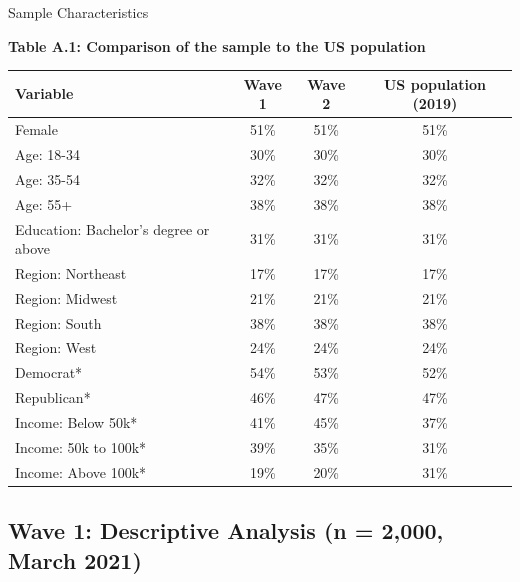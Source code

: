 \documentclass{beamer}
\begin{document}
\begin{frame}{Sample Characteristics}

\begin{table}[h]
    \centering
    \scriptsize
    \textbf{Table A.1: Comparison of the sample to the US population}\par
    \begin{tabular}{lccc}
    \toprule\toprule
    Variable & Wave 1 & Wave 2 & US population (2019) \\
    \midrule
    Female                              & 51\% & 51\% & 51\% \\
    Age: 18-34                          & 30\% & 30\% & 30\% \\
    Age: 35-54                          & 32\% & 32\% & 32\% \\
    Age: 55+                            & 38\% & 38\% & 38\% \\
    Education: Bachelor's degree or above & 31\% & 31\% & 31\% \\
    Region: Northeast                   & 17\% & 17\% & 17\% \\
    Region: Midwest                     & 21\% & 21\% & 21\% \\
    Region: South                       & 38\% & 38\% & 38\% \\
    Region: West                        & 24\% & 24\% & 24\% \\
    Democrat*                           & 54\% & 53\% & 52\% \\
    Republican*                         & 46\% & 47\% & 47\% \\
    Income: Below 50k*                  & 41\% & 45\% & 37\% \\
    Income: 50k to 100k*                & 39\% & 35\% & 31\% \\
    Income: Above 100k*                 & 19\% & 20\% & 31\% \\
    \bottomrule\bottomrule
    \end{tabular}
\end{table}
    
\end{frame}

\subsection{Wave 1: Descriptive Analysis (n = 2,000, March 2021)}
\end{document}
